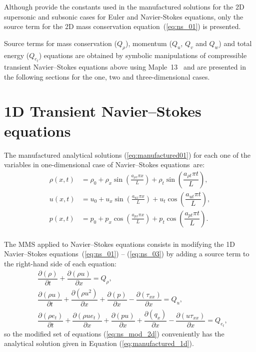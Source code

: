 \documentclass[10pt]{article}
\newcommand{\Diff}[2] {\dfrac{\partial( #1)}{\partial #2}}
\begin{document}
Although \citet{Roy2002} provide the constants used in the manufactured solutions for the 2D supersonic and subsonic cases for Euler and Navier-Stokes equations, only the source term for the 2D mass conservation equation~(\ref{eq:ns_01}) is presented.


Source terms  for mass conservation ($Q_\rho$), momentum ($Q_u$, $Q_v$ and $Q_w$)  and total energy ($Q_{e_t}$) equations are obtained by symbolic manipulations of compressible transient Navier--Stokes equations above using Maple~13~\citep{Maple} and are presented in the following sections for the one, two and three-dimensional cases.


\section{1D Transient Navier--Stokes equations}

The manufactured analytical solutions (\ref{eq:manufactured01}) for each one of the variables in one-dimensional case of Navier--Stokes equations~are:
\begin{equation}
\begin{split}
\label{eq:manufactured_1d}
\rho\left(x,t\right) &=  \rho_{0}+ \rho_{x} \sin\left(\frac{a_{ \rho x} \pi x}{L}\right)+ \rho_t \sin\left(\dfrac{a_{\rho t} \pi t}{L}\right),\\
u\left(x,t\right) &= u_{0}+u_{x} \sin\left(\frac{a_{u x} \pi x}{L}\right) + u_t \cos\left(\dfrac{a_{u t} \pi t}{L}\right),\\
p\left(x,t\right) &= p_{0}+p_{x} \cos\left(\frac{a_{p x} \pi x}{L}\right)+ p_t \cos\left(\dfrac{a_{p t} \pi t}{L}\right).\\
\end{split}
\end{equation}


The MMS applied to Navier--Stokes equations consists in modifying the 1D Navier--Stokes equations~(\ref{eq:ns_01}) -- (\ref{eq:ns_03}) by adding a source term to the right-hand side of each equation:
\begin{equation}
 \label{eq:ns_mod_2d}
\begin{split}
&\Diff{\rho}{t} +\Diff{\rho u}{x} = Q_\rho,\\
&\Diff{\rho u}{t} + \Diff{\rho u^2 }{x}+ \Diff{p}{x} -\Diff{\tau_{xx}}{x}= Q_u,\\
&\Diff{\rho e_t}{t} +\Diff{\rho ue_t}{x}+ \Diff{pu}{x}+ \Diff{q_x}{x}-\Diff{u\tau_{xx}}{x} = Q_{e_t},
\end{split}
\end{equation}
%
so the modified set of equations (\ref{eq:ns_mod_2d}) conveniently has the analytical solution given in Equation (\ref{eq:manufactured_1d}).
%
\end{document}
